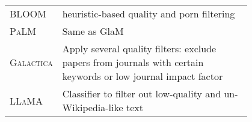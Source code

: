 \begin{table}[t]
\begin{tabular}{l|p{0.8\linewidth}}
\textsc{BLOOM} & heuristic-based quality and porn filtering\\
\textsc{PaLM} & Same as GlaM \\
\textsc{Galactica} & Apply several quality filters: exclude papers from journals with certain keywords or low journal impact factor \\
\textsc{LLaMA} & Classifier to filter out low-quality and un-Wikipedia-like text \\
\bottomrule
\end{tabular}
\end{table}



